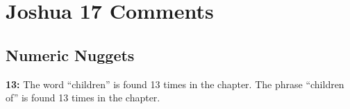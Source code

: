 \section{Joshua 17 Comments}

\subsection{Numeric Nuggets}
\textbf{13: } The word ``children'' is found 13 times in the chapter. The phrase ``children of'' is found 13 times in the chapter.